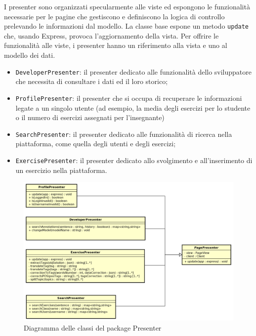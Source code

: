 I presenter sono organizzati specularmente alle viste ed espongono le funzionalità necessarie per le pagine che gestiscono e definiscono la logica di controllo prelevando le informazioni dal modello. La classe base espone un metodo \texttt{update} che, usando Express, provoca l'aggiornamento della vista. Per offrire le funzionalità alle viste, i presenter hanno un riferimento alla vista e uno al modello dei dati.
\begin{itemize}
	\item \texttt{DeveloperPresenter}: il presenter dedicato alle funzionalità dello sviluppatore che necessita di consultare i dati ed il loro storico;
	\item \texttt{ProfilePresenter}: il presenter che si occupa di recuperare le informazioni legate a un singolo utente (ad esempio, la media degli esercizi per lo studente o il numero di esercizi assegnati per l'insegnante)
	\item \texttt{SearchPresenter}: il presenter dedicato alle funzionalità di ricerca nella piattaforma, come quella degli utenti e degli esercizi;
	\item \texttt{ExercisePresenter}: il presenter dedicato allo svolgimento e all'inserimento di un esercizio nella piattaforma.
\end{itemize}

\begin{figure}[h]
	\includegraphics[scale=0.53]{images/Presenter.png}
	\caption{Diagramma delle classi del package Presenter}
\end{figure}
